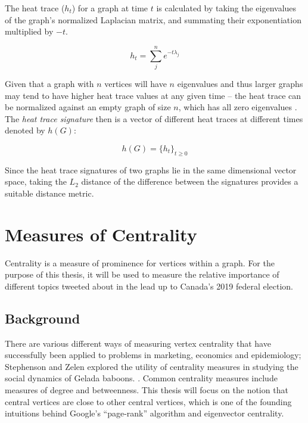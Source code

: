 The heat trace ($h_{t}$) for a graph at time $t$ is calculated by taking the
eigenvalues of the graph's normalized Laplacian matrix, and summating their
exponentiation multiplied by $-t$. 

\begin{equation}\label{equation:heat_trace}
    h_{t}=\sum_{j}^{n}e^{-t\lambda_{j}}
\end{equation}
 
Given that a graph with $n$ vertices will have $n$ eigenvalues and thus larger
graphs may tend to have higher heat trace values at any given time -- the heat
trace can be normalized against an empty graph of size $n$, which has all zero
eigenvalues \cite{netlsd}. The \emph{heat trace signature} then is a vector of
different heat traces at different times denoted by $h(G)$:

\begin{equation}\label{equation:heat_trace_sig}
    h(G) = \{h_{t}\}_{t\geq0}
\end{equation}

Since the heat trace signatures of two graphs lie in the same dimensional vector
space, taking the $L_{2}$ distance of the difference between the signatures
provides a suitable distance metric.
	
\section{Measures of Centrality}

Centrality is a measure of prominence for vertices within a graph. For the
purpose of this thesis, it will be used to measure the relative importance of
different topics tweeted about in the lead up to Canada's 2019 federal election.

\subsection{Background}\label{sec:CentralityBackground}

There are various different ways of measuring vertex centrality that have
successfully been applied to problems in marketing, economics and epidemiology;
Stephenson and Zelen explored the utility of centrality measures in studying the
social dynamics of Gelada baboons. \cite{stephenson1989rethinking}. Common
centrality measures include measures of degree and betweenness. This thesis will
focus on the notion that central vertices are close to other central vertices,
which is one of the founding intuitions behind Google’s “page-rank” algorithm
and eigenvector centrality. 

